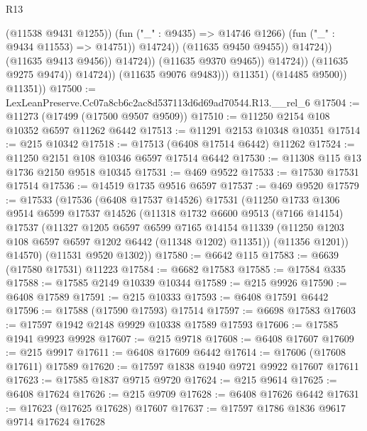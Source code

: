 \begin{lexlean}{R13}
\begin{coremodule}
                                                (@11538 @9431 @1255))
                                              (fun ("_" : @9435) => @14746 @1266)
                                              (fun ("_" : @9434 @11553) => @14751))
                                            @14724))
                                        (@11635 @9450 @9455))
                                      @14724))
                                  (@11635 @9413 @9456))
                                @14724))
                            (@11635 @9370 @9465))
                          @14724))
                      (@11635 @9275 @9474))
                    @14724))
                (@11635 @9076 @9483)))
            @11351)
          (@14485 @9500))
        @11351))
@17500 := LexLeanPreserve.Cc07a8cb6c2ac8d537113d6d69ad70544.R13.__rel_6
@17504 := @11273 (@17499 (@17500 @9507 @9509))
@17510 := @11250 @2154 @108 @10352 @6597 @11262 @6442
@17513 := @11291 @2153 @10348 @10351
@17514 := @215 @10342
@17518 := @17513 (@6408 @17514 @6442) @11262
@17524 := @11250 @2151 @108 @10346 @6597 @17514 @6442
@17530 := @11308 @115 @13 @1736 @2150 @9518 @10345
@17531 := @469 @9522
@17533 := @17530 @17531 @17514
@17536 := @14519 @1735 @9516 @6597
@17537 := @469 @9520
@17579 := @17533
    (@17536
      (@6408 @17537 @14526)
      @17531
      (@11250
        @1733
        @1306
        @9514
        @6599
        @17537
        @14526
        (@11318
          @1732
          @6600
          @9513
          (@7166 @14154)
          @17537
          (@11327
            @1205
            @6597
            @6599
            @7165
            @14154
            @11339
            (@11250 @1203 @108 @6597 @6597 @1202 @6442 (@11348 @1202) @11351))
          (@11356 @1201))
        @14570)
      (@11531 @9520 @1302))
@17580 := @6642 @115
@17583 := @6639 (@17580 @17531) @11223
@17584 := @6682 @17583
@17585 := @17584 @335
@17588 := @17585 @2149 @10339 @10344
@17589 := @215 @9926
@17590 := @6408 @17589
@17591 := @215 @10333
@17593 := @6408 @17591 @6442
@17596 := @17588 (@17590 @17593) @17514
@17597 := @6698 @17583
@17603 := @17597 @1942 @2148 @9929 @10338 @17589 @17593
@17606 := @17585 @1941 @9923 @9928
@17607 := @215 @9718
@17608 := @6408 @17607
@17609 := @215 @9917
@17611 := @6408 @17609 @6442
@17614 := @17606 (@17608 @17611) @17589
@17620 := @17597 @1838 @1940 @9721 @9922 @17607 @17611
@17623 := @17585 @1837 @9715 @9720
@17624 := @215 @9614
@17625 := @6408 @17624
@17626 := @215 @9709
@17628 := @6408 @17626 @6442
@17631 := @17623 (@17625 @17628) @17607
@17637 := @17597 @1786 @1836 @9617 @9714 @17624 @17628

\end{coremodule}
\end{lexlean}
